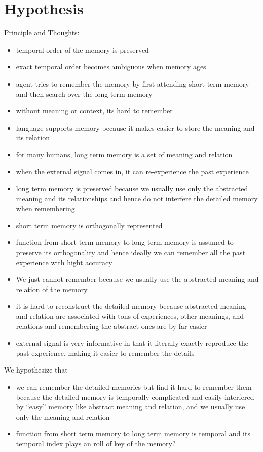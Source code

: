 \documentclass[12pt]{article}
\begin{document}
\section{Hypothesis}
Principle and Thoughts:
\begin{itemize}
    \item temporal order of the memory is preserved
    \item exact temporal order becomes ambiguous when memory ages
    \item agent tries to remember the memory by first attending short term memory and then search 
          over the long term memory 
    \item without meaning or context, its hard to remember
    \item language supports memory because it makes easier to store the meaning and its relation
    \item for many humans, long term memory is a set of meaning and relation
    \item when the external signal comes in, it can re-experience the past experience
    \item long term memory is preserved because we usually use only the abstracted meaning and its relationships
          and hence do not interfere the detailed memory when remembering
    \item short term memory is orthogonally represented
    \item function from short term memory to long term memory is assumed to preserve its orthogonality
          and hence ideally we can remember all the past experience with hight accuracy
    \item We just cannot remember because we usually use the abstracted meaning and relation 
          of the memory 
    \item it is hard to reconstruct the detailed memory because abstracted meaning and relation are 
          associated with tons of experiences, other meanings, and relations and remembering the abstract
          ones are by far easier
    \item external signal is very informative in that it literally exactly reproduce the past experience, 
          making it easier to remember the details
\end{itemize}

We hypothesize that 
\begin{itemize}
    \item we can remember the detailed memories but find it hard to remember them because 
          the detailed memory is temporally complicated and easily interfered by ``easy'' memory 
          like abstract meaning and relation, and we usually use only the meaning and relation
    \item function from short term memory to long term memory is temporal and its temporal index 
          plays an roll of key of the memory?
\end{itemize}



\end{document}
